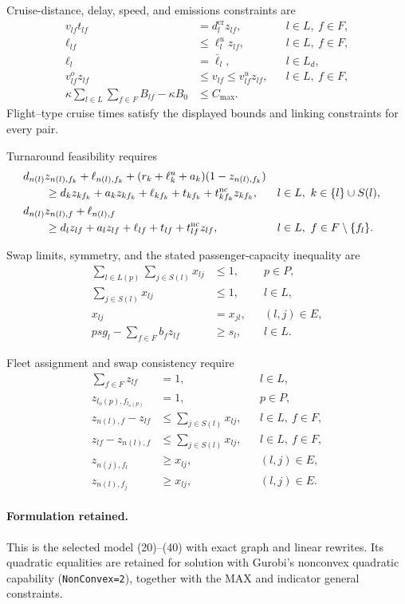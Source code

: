 \documentclass{article}
\begin{document}
Cruise-distance, delay, speed, and emissions constraints are
\begin{align}
 v_{lf}t_{lf}&=d_l^{\mathrm{cr}}z_{lf}, &&l\in L,\ f\in F,\\
 \ell_{lf}&\leq\ell_l^u z_{lf}, &&l\in L,\ f\in F,\\
 \ell_l&=\bar\ell_l, &&l\in L_d,\\
 v_{lf}^{o}z_{lf}&\leq v_{lf}\leq v_{lf}^{u}z_{lf}, &&l\in L,\ f\in F,\\
 \kappa\sum_{l\in L}\sum_{f\in F}B_{lf}-\kappa B_0&\leq C_{\max}.
\end{align}
Flight--type cruise times satisfy the displayed bounds and linking constraints for every pair.

Turnaround feasibility requires
\begin{align}
 &d_{n(l)}z_{n(l),f_k}+\ell_{n(l),f_k}
 +(r_k+\ell_k^u+a_k)(1-z_{n(l),f_k})\notag\\
 &\qquad\geq d_kz_{k f_k}+a_kz_{k f_k}
 +\ell_{k f_k}+t_{k f_k}+t_{k f_k}^{\mathrm{nc}}z_{k f_k},
 &&l\in L,\ k\in\{l\}\cup S(l),\\
 &d_{n(l)}z_{n(l),f}+\ell_{n(l),f}\notag\\
 &\qquad\geq d_lz_{lf}+a_lz_{lf}
 +\ell_{lf}+t_{lf}+t_{lf}^{\mathrm{nc}}z_{lf},
 &&l\in L,\ f\in F\setminus\{f_l\}.
\end{align}

Swap limits, symmetry, and the stated passenger-capacity inequality are
\begin{align}
 \sum_{l\in L(p)}\sum_{j\in S(l)}x_{lj}&\leq1, &&p\in P,\\
 \sum_{j\in S(l)}x_{lj}&\leq1, &&l\in L,\\
 x_{lj}&=x_{jl}, &&(l,j)\in E,\\
 psg_l-\sum_{f\in F}b_fz_{lf}&\geq s_l, &&l\in L.
\end{align}

Fleet assignment and swap consistency require
\begin{align}
 \sum_{f\in F}z_{lf}&=1, &&l\in L,\\
 z_{l_o(p),f_{l_o(p)}}&=1, &&p\in P,\\
 z_{n(l),f}-z_{lf}&\leq\sum_{j\in S(l)}x_{lj}, &&l\in L,\ f\in F,\\
 z_{lf}-z_{n(l),f}&\leq\sum_{j\in S(l)}x_{lj}, &&l\in L,\ f\in F,\\
 z_{n(j),f_l}&\geq x_{lj}, &&(l,j)\in E,\\
 z_{n(l),f_j}&\geq x_{lj}, &&(l,j)\in E.
\end{align}

\paragraph{Formulation retained.}
This is the selected model (20)--(40) with exact graph and linear rewrites.  Its quadratic equalities are retained for solution with Gurobi's nonconvex quadratic capability (\texttt{NonConvex=2}), together with the MAX and indicator general constraints.
\end{document}
